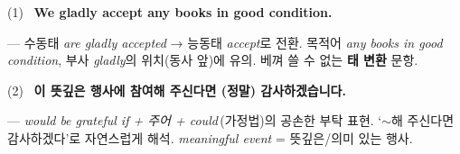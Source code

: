 \documentclass[11pt,a4paper]{article}
\begin{document}
\vspace{6pt}{\sffamily\bfseries 4. 서술형}\par\vspace{2pt}
(1)  \ \textbf{We gladly accept any books in good condition.}
\par\vspace{1pt}\hspace{1.5em}— 수동태 \textit{are gladly accepted} → 능동태 \textit{accept}로 전환. 목적어 \textit{any books in good condition}, 부사 \textit{gladly}의 위치(동사 앞)에 유의. 베껴 쓸 수 없는 \textbf{태 변환} 문항.
\par\vspace{4pt}
(2)  \ \textbf{이 뜻깊은 행사에 참여해 주신다면 (정말) 감사하겠습니다.}
\par\vspace{1pt}\hspace{1.5em}— \textit{would be grateful if + 주어 + could}\,(가정법)의 공손한 부탁 표현. ‘$\sim$해 주신다면 감사하겠다’로 자연스럽게 해석. \textit{meaningful event} = 뜻깊은/의미 있는 행사.
\end{document}
